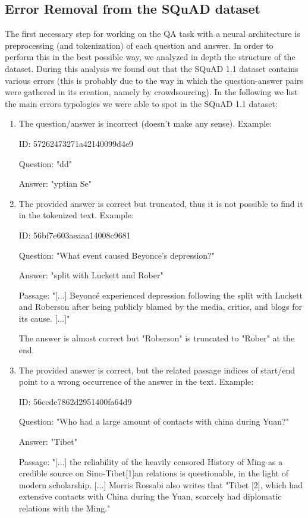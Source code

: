 \documentclass{article}
\begin{document}
\subsection{Error Removal from the SQuAD dataset}
The first necessary step for working on the QA task with a neural architecture is preprocessing (and tokenization) of each question and answer. In order to perform this in the best possible way, we analyzed in depth the structure of the dataset. During this analysis we found out that the SQuAD 1.1 dataset contains various errors (this is probably due to the way in which the question-answer pairs were gathered in its creation, namely by crowdsourcing).
In the following we list the main errors typologies we were able to spot in the SQuAD 1.1 dataset:

\begin{enumerate}
    \item The question/answer is incorrect (doesn't make any sense). Example:
    
    ID: 57262473271a42140099d4e9
    
    Question: "dd"
    
    Answer: "yptian Se"
    
    \item The provided answer is correct but truncated, thus it is not possible to find it in the tokenized text. Example:
    
    ID: 56bf7e603aeaaa14008c9681
    
    Question:  "What event caused Beyonce's depression?"

    Answer: "split with Luckett and Rober"

    Passage: "[...] Beyoncé experienced depression following the split with Luckett and Roberson after being publicly blamed by the media, critics, and blogs for its cause. [...]"
    
    The answer is almost correct but "Roberson" is truncated to "Rober" at the end.
    
    \item The provided answer is correct, but the related passage indices of start/end point to a wrong occurrence of the answer in the text. Example:
    
    ID: 56ccde7862d2951400fa64d9
    
    Question: "Who had a large amount of contacts with china during Yuan?"

    Answer: "Tibet"

    Passage: "[...] the reliability of the heavily censored History of Ming as a credible source on Sino-Tibet[1]an relations is questionable, in the light of modern scholarship. [...] Morris Rossabi also writes that "Tibet [2], which had extensive contacts with China during the Yuan, scarcely had diplomatic relations with the Ming."
    

\end{enumerate}
\end{document}
